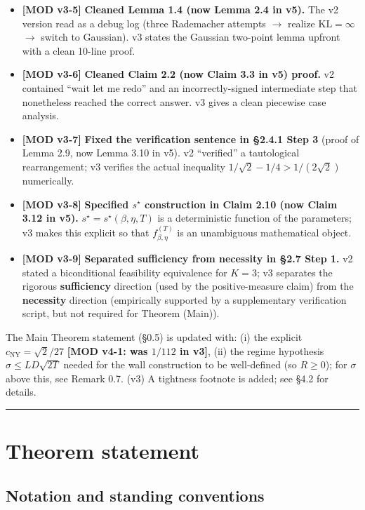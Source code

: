 \documentclass[11pt,a4paper]{article}
\theoremstyle{plain}
\theoremstyle{definition}
\theoremstyle{remark}
\newcommand{\KL}{\mathrm{KL}}
\begin{document}
\begin{itemize}[leftmargin=*]
\item \textbf{[MOD v3-5]} \textbf{Cleaned Lemma 1.4 (now Lemma 2.4 in v5).} The v2 version read as a debug log (three Rademacher attempts $\to$ realize $\KL = \infty$ $\to$ switch to Gaussian). v3 states the Gaussian two-point lemma upfront with a clean 10-line proof.
\item \textbf{[MOD v3-6]} \textbf{Cleaned Claim 2.2 (now Claim 3.3 in v5) proof.} v2 contained ``wait let me redo'' and an incorrectly-signed intermediate step that nonetheless reached the correct answer. v3 gives a clean piecewise case analysis.
\item \textbf{[MOD v3-7]} \textbf{Fixed the verification sentence in \S2.4.1 Step 3} (proof of Lemma 2.9, now Lemma 3.10 in v5). v2 ``verified'' a tautological rearrangement; v3 verifies the actual inequality $1/\sqrt 2 - 1/4 > 1/(2\sqrt 2)$ numerically.
\item \textbf{[MOD v3-8]} \textbf{Specified $s^\star$ construction in Claim 2.10 (now Claim 3.12 in v5).} $s^\star = s^\star(\beta,\eta,T)$ is a deterministic function of the parameters; v3 makes this explicit so that $f_{\beta,\eta}^{(T)}$ is an unambiguous mathematical object.
\item \textbf{[MOD v3-9]} \textbf{Separated sufficiency from necessity in \S2.7 Step 1.} v2 stated a biconditional feasibility equivalence for $K=3$; v3 separates the rigorous \textbf{sufficiency} direction (used by the positive-measure claim) from the \textbf{necessity} direction (empirically supported by a supplementary verification script, but not required for Theorem (Main)).
\end{itemize}

The Main Theorem statement (\S0.5) is updated with: (i) the explicit $c_\mathrm{NY} = \sqrt 2/27$ \textbf{[MOD v4-1: was $1/112$ in v3]}, (ii) the regime hypothesis $\sigma \leq L D\sqrt{2T}$ needed for the wall construction to be well-defined (so $R \geq 0$); for $\sigma$ above this, see Remark 0.7. (v3) A tightness footnote is added; see \S4.2 for details.

\bigskip
\hrule
\bigskip

\section{Theorem statement}

\subsection{Notation and standing conventions}
\end{document}
